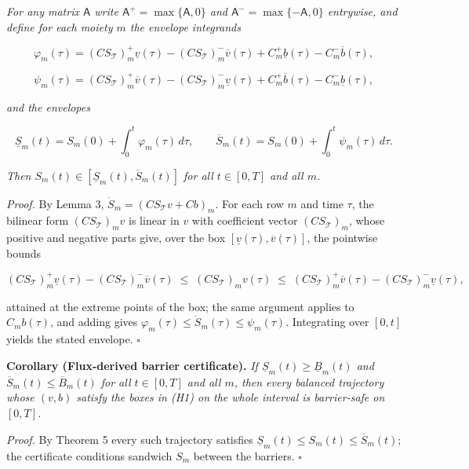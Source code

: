 \documentclass[11pt]{article}
\begin{document}
\emph{For any matrix \(\mathsf{A}\) write \(\mathsf{A}^{+\allowbreak{}} =\allowbreak{} \max\{\mathsf{A},\allowbreak{} 0\}\) and \(\mathsf{A}^{-} =\allowbreak{} \max\{-\mathsf{A},\allowbreak{} 0\}\) entrywise, and define for each moiety \(m\) the envelope integrands} 

$$\varphi_m(\tau) = (C S_{\mathcal{T}})_{m}^{+} \underline{v}(\tau) - (C S_{\mathcal{T}})_{m}^{-} \overline{v}(\tau) + C_{m}^{+} \underline{b}(\tau) - C_{m}^{-} \overline{b}(\tau),$$

 

$$\psi_m(\tau) = (C S_{\mathcal{T}})_{m}^{+} \overline{v}(\tau) - (C S_{\mathcal{T}})_{m}^{-} \underline{v}(\tau) + C_{m}^{+} \overline{b}(\tau) - C_{m}^{-} \underline{b}(\tau),$$

 \emph{and the envelopes} 

$$\underline{S}_m(t) = S_m(0) + \int_0^t \varphi_m(\tau)\, d\tau, \qquad \overline{S}_m(t) = S_m(0) + \int_0^t \psi_m(\tau)\, d\tau.$$

 \emph{Then \(S_m(t) \in [\underline{S}_m(t),\allowbreak{} \overline{S}_m(t)]\) for all \(t \in [0,T]\) and all \(m\).}

\emph{Proof.} By Lemma 3, \(\dot S_m =\allowbreak{} (C S_{\mathcal{T}} v +\allowbreak{} Cb)_m\). For each row \(m\) and time \(\tau\), the bilinear form \((C S_{\mathcal{T}})_m v\) is linear in \(v\) with coefficient vector \((C S_{\mathcal{T}})_m\), whose positive and negative parts give, over the box \([\underline{v}(\tau),\allowbreak{} \overline{v}(\tau)]\), the pointwise bounds 

$$(C S_{\mathcal{T}})_{m}^{+} \underline{v}(\tau) - (C S_{\mathcal{T}})_{m}^{-} \overline{v}(\tau) \;\le\; (C S_{\mathcal{T}})_m v(\tau) \;\le\; (C S_{\mathcal{T}})_{m}^{+} \overline{v}(\tau) - (C S_{\mathcal{T}})_{m}^{-} \underline{v}(\tau),$$

 attained at the extreme points of the box; the same argument applies to \(C_m b(\tau)\), and adding gives \(\varphi_m(\tau) \le \dot S_m(\tau) \le \psi_m(\tau)\). Integrating over \([0,t]\) yields the stated envelope. \(\square\)

\textbf{Corollary (Flux-derived barrier certificate).} \emph{If \(\underline{S}_m(t) \ge \underline{B}_m(t)\) and \(\overline{S}_m(t) \le \overline{B}_m(t)\) for all \(t \in [0,T]\) and all \(m\), then every balanced trajectory whose \((v,b)\) satisfy the boxes in (H1) on the whole interval is barrier-safe on \([0,T]\).}

\emph{Proof.} By Theorem 5 every such trajectory satisfies \(\underline{S}_m(t) \le S_m(t) \le \overline{S}_m(t)\); the certificate conditions sandwich \(S_m\) between the barriers. \(\square\)
\end{document}
